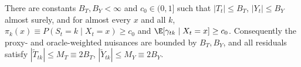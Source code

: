 
\begin{assumption}
\label{ass:envelopes}
There are constants $B_T,B_Y<\infty$ and $c_0\in(0,1]$ such that $|T_t|\le B_T$,
$|Y_t|\le B_Y$ almost surely, and for almost every $x$ and all $k$,
$\pi_k(x)\equiv P(S_t=k\mid X_t=x)\ge c_0$ and $\E[\gamma_{tk}\mid X_t=x]\ge c_0$.
Consequently the proxy- and oracle-weighted nuisances are bounded by $B_T,B_Y$,
and all residuals satisfy $|\tilde T_{tk}|\le M_T\equiv 2B_T$,
$|\tilde Y_{tk}|\le M_Y\equiv 2B_Y$.
\end{assumption}

